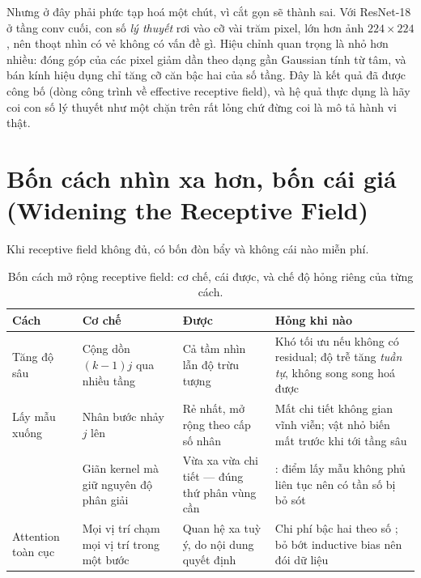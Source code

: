 \documentclass[../../deep_learning.tex]{subfiles}
\begin{document}
Nhưng ở đây phải phức tạp hoá một chút, vì cắt gọn sẽ thành sai. Với ResNet-18 ở tầng conv cuối, con số \emph{lý thuyết} rơi vào cỡ vài trăm pixel, lớn hơn ảnh \(224\times224\), nên thoạt nhìn có vẻ không có vấn đề gì. Hiệu chỉnh quan trọng là  nhỏ hơn nhiều: đóng góp của các pixel giảm dần theo dạng gần Gaussian tính từ tâm, và bán kính hiệu dụng chỉ tăng cỡ căn bậc hai của số tầng. Đây là kết quả đã được công bố (dòng công trình về effective receptive field), và hệ quả thực dụng là hãy coi con số lý thuyết như một chặn trên rất lỏng chứ đừng coi là mô tả hành vi thật.

\section{Bốn cách nhìn xa hơn, bốn cái giá (Widening the Receptive Field)}

Khi receptive field không đủ, có bốn đòn bẩy và không cái nào miễn phí.

\begin{table}[H]\centering\small
\caption{Bốn cách mở rộng receptive field: cơ chế, cái được, và chế độ hỏng riêng của từng cách.}
\label{tab:mo-rong-rf}
\begin{tabularx}{\linewidth}{@{}L{2.4cm}L{3.6cm}YL{3.4cm}@{}}
\toprule
\textbf{Cách} & \textbf{Cơ chế} & \textbf{Được} & \textbf{Hỏng khi nào}\\
\midrule
Tăng độ sâu & Cộng dồn \((k-1)j\) qua nhiều tầng & Cả tầm nhìn lẫn độ trừu tượng & Khó tối ưu nếu không có residual; độ trễ tăng \emph{tuần tự}, không song song hoá được\\
Lấy mẫu xuống & Nhân bước nhảy \(j\) lên & Rẻ nhất, mở rộng theo cấp số nhân & Mất chi tiết không gian vĩnh viễn; vật nhỏ biến mất trước khi tới tầng sâu\\
 \cite{yu2016dilated} & Giãn kernel mà giữ nguyên độ phân giải & Vừa xa vừa chi tiết --- đúng thứ phân vùng cần & : điểm lấy mẫu không phủ liên tục nên có tần số bị bỏ sót\\
Attention toàn cục \cite{vaswani2017attention} & Mọi vị trí chạm mọi vị trí trong một bước & Quan hệ xa tuỳ ý, do nội dung quyết định & Chi phí bậc hai theo số ; bỏ bớt inductive bias nên đói dữ liệu\\
\bottomrule
\end{tabularx}
\end{table}
\end{document}
